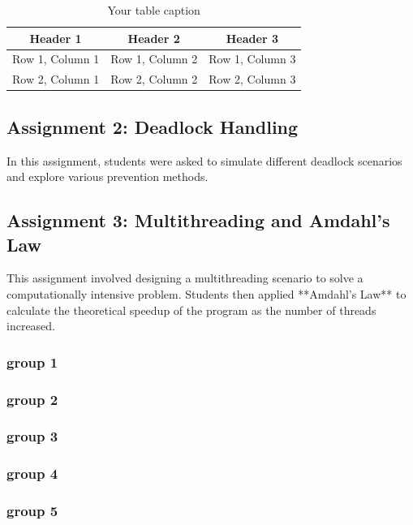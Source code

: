 \documentclass[12pt]{article}
\begin{document}
\begin{table}[htbp] %
    \centering
    \begin{tabular}{|c|c|c|} %
    \hline
    Header 1 & Header 2 & Header 3 \\ %
    \hline
    Row 1, Column 1 & Row 1, Column 2 & Row 1, Column 3 \\ %
    \hline
    Row 2, Column 1 & Row 2, Column 2 & Row 2, Column 3 \\ %
    \hline
    \end{tabular}
    \caption{Your table caption} %
    \label{tab:your_label} %
\end{table}

\subsection{Assignment 2: Deadlock Handling}
In this assignment, students were asked to simulate different deadlock scenarios and explore various prevention methods.

\subsection{Assignment 3: Multithreading and Amdahl's Law}
This assignment involved designing a multithreading scenario to solve a computationally intensive problem. Students then applied **Amdahl's Law** to calculate the theoretical speedup of the program as the number of threads increased.

\subsubsection{group 1}
\subsubsection{group 2}
\subsubsection{group 3}
\subsubsection{group 4}
\subsubsection{group 5}
\end{document}
